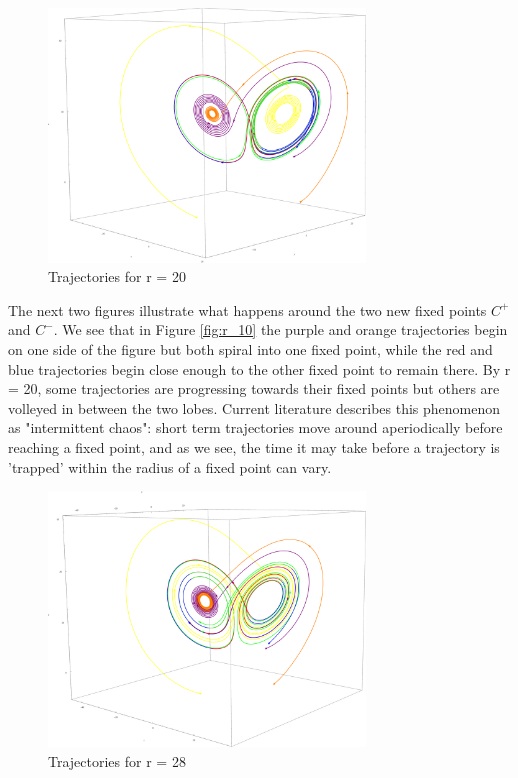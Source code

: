 \documentclass{report}
\begin{document}
\begin{figure}[h]
  \centering
  \includegraphics[width=0.75\textwidth]{r20.eps}
  \caption{Trajectories for r = 20}
  \label{fig:r_20}
\end{figure}
The next two figures illustrate what happens around the two new fixed points
\(C^+\) and \(C^-\). We see that in Figure \ref{fig:r_10} the purple and
orange trajectories begin on one side of the figure but both spiral into one
fixed point, while the red and blue trajectories begin close enough to the
other fixed point to remain there. By r = 20, some trajectories are progressing
towards their fixed points but others are volleyed in between the two lobes.
Current literature describes this phenomenon as "intermittent chaos": short
term trajectories move around aperiodically before reaching a fixed point,
and as we see, the time it may take before a trajectory is 'trapped' within
the radius of a fixed point can vary.

\begin{figure}[h]
  \centering
  \includegraphics[width=0.75\textwidth]{r28.eps}
  \caption{Trajectories for r = 28}
  \label{fig:r_28}
\end{figure}
\end{document}
